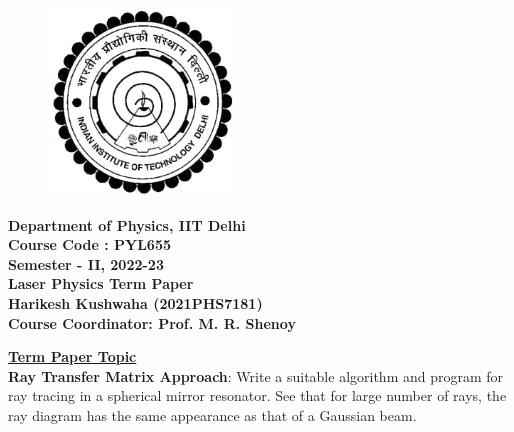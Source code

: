 \documentclass[12pt]{article}
\date{\today}
\begin{document}
\begin{titlepage}
    \begin{figure}
        \includegraphics[width=5cm, height=5cm]{logo.png}
        \centering
    \end{figure}
    \begin{center}
        \textbf{\Large{Department of Physics, IIT Delhi}}\\
        \vspace*{1cm}
        \textbf{\Large{Course Code : PYL655}}\\
        \vspace*{0.2cm}
        \textbf{\Large {Semester - II, 2022-23}}\\
        \vspace*{1cm}
        \textbf{\LARGE{Laser Physics Term Paper}}\\
        \vspace*{1cm}
        \textbf{\Large {Harikesh Kushwaha (2021PHS7181)}}\\
        \vspace*{1cm}
        \textbf{\Large {Course Coordinator: Prof. M. R. Shenoy}}\\
        \vspace*{1cm}
    \end{center}
    \begin{flushleft}
        \underline{\textbf{\LARGE{Term Paper Topic}}}\\
        \Large{\textbf{Ray Transfer Matrix Approach}: Write a suitable algorithm and program for ray tracing in a spherical mirror resonator. See that for large number of rays, the ray diagram has the same appearance as that of a Gaussian beam.}
    \end{flushleft}
\end{titlepage}
\newpage
\end{document}
